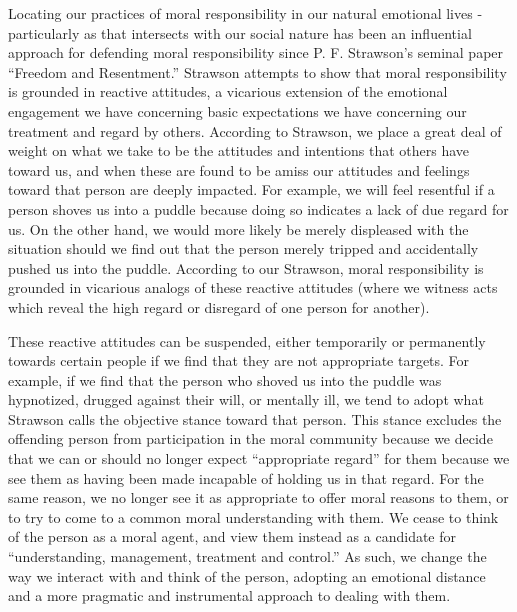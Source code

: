 \documentclass[phd,12pt,oneside,paper=letterpaper]{ubcthesis}
\begin{document}
Locating our practices of moral responsibility in our natural emotional lives - particularly as that intersects with our social nature has been an influential approach for defending moral responsibility since P. F. Strawson's seminal paper ``Freedom and Resentment.'' \citep{strawsonp1974} Strawson attempts to show that moral responsibility is grounded in reactive attitudes, a vicarious extension of the emotional engagement we have concerning basic expectations we have concerning our treatment and regard by others. According to Strawson, we place a great deal of weight on what we take to be the attitudes and intentions that others have toward us, and when these are found to be amiss our attitudes and feelings toward that person are deeply impacted. \citep[p.5]{strawsonp1974} For example, we will feel resentful if a person shoves us into a puddle because doing so indicates a lack of due regard for us. On the other hand, we would more likely be merely displeased with the situation should we find out that the person merely tripped and accidentally pushed us into the puddle. According to our Strawson, moral responsibility is grounded in vicarious analogs of these reactive attitudes (where we witness acts which reveal the high regard or disregard of one person for another).

These reactive attitudes can be suspended, either temporarily or permanently towards certain people if we find that they are not appropriate targets. For example, if we find that the person who shoved us into the puddle was hypnotized, drugged against their will, or mentally ill, we tend to adopt what Strawson calls the objective stance toward that person.\citep[p.9]{strawsonp1974} This stance excludes the offending person from participation in the moral community because we decide that we can or should no longer expect ``appropriate regard'' for them because we see them as having been made incapable of holding us in that regard. For the same reason, we no longer see it as appropriate to offer moral reasons to them, or to try to come to a common moral understanding with them. We cease to think of the person as a moral agent, and view them instead as a candidate for ``understanding, management, treatment and control.'' \citep[p.9]{strawsonp1974} As such, we change the way we interact with and think of the person, adopting an emotional distance and a more pragmatic and instrumental approach to dealing with them. 
 
\end{document}
